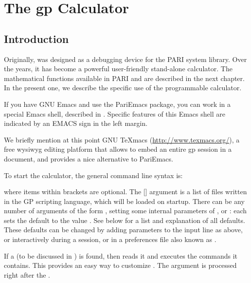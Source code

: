 %
%
\chapter{The gp Calculator}

\section{Introduction}

Originally,  was designed as a debugging device for the PARI system
library. Over the years, it has become a powerful user-friendly stand-alone
calculator. The mathematical functions available in PARI and  are
described in the next chapter. In the present one, we describe the specific
use of the  programmable calculator.

\emacs If you have GNU Emacs and use the PariEmacs package, you can work in a
special Emacs shell, described in . Specific features of
this Emacs shell are indicated by an EMACS sign in the left margin.

We briefly mention at this point GNU
TeXmacs (\url{http://www.texmacs.org/}), a free wysiwyg editing
platform that allows to embed an entire gp session in a document, and
provides a nice alternative to PariEmacs.


To start the calculator, the general command line syntax is:


\noindent
where items within brackets are optional. The [] argument is a
list of files written in the GP scripting language, which will be loaded on
startup. There can be any number of arguments of the form
, setting some internal parameters of ,
or : each sets the default  to the value . See
 below for a list and explanation of all defaults. These
defaults can be changed by adding parameters to the input line as above, or
interactively during a  session, or in a preferences file also known
as .

If a  (to be discussed in ) is
found,  then reads it and executes the commands it contains. This
provides an easy way to customize . The  argument is
processed right after the .

